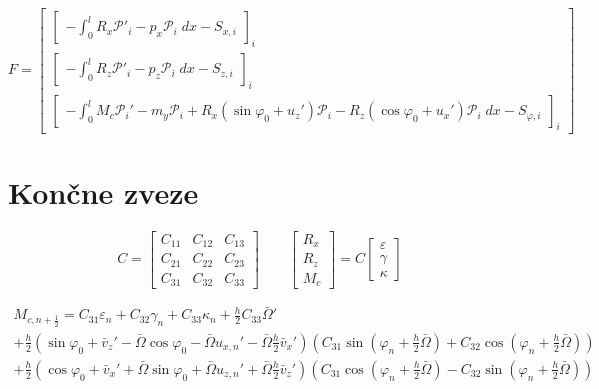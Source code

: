 \documentclass[a4paper,6pt]{article}
\begin{document}
\begin{flushleft}
\begin{equation}
  F=\begin{bmatrix}
      \begin{bmatrix}
        -\int_0^l R_x\mathcal{P}'_i - p_x\mathcal{P}_i\;dx-S_{x,i}
      \end{bmatrix}_i \\
      \begin{bmatrix}
        -\int_0^l R_z\mathcal{P}'_i - p_z\mathcal{P}_i\;dx-S_{z,i}
      \end{bmatrix}_i \\
      \begin{bmatrix}
        -\int_0^l M_c \mathcal{P}_i' -m_y \mathcal{P}_i + R_x(\sin\varphi_0 +u_z')\mathcal{P}_i - R_z(\cos\varphi_0 + u_x') \mathcal{P}_i \;dx-S_{\varphi,i}
      \end{bmatrix}_i
  \end{bmatrix}
\end{equation}


\newpage
\section{Končne zveze}
\begin{equation}
  C=\begin{bmatrix}
    C_{11} & C_{12} & C_{13} \\ C_{21} & C_{22} & C_{23} \\ C_{31} & C _{32} & C_{33}
  \end{bmatrix}
  \qquad 
  \begin{bmatrix}
    R_x \\ R_z \\M_c
  \end{bmatrix} = 
  C \begin{bmatrix}
    \varepsilon \\ \gamma \\ \kappa
   \end{bmatrix}
\end{equation}

\begin{multline}
  M_{c,n+\frac{1}{2}}=C_{31}\varepsilon_n + C_{32}\gamma_n + C_{33}\kappa_n+ \frac{h}{2} C_{33}\bar{\Omega}'\\
    +\frac{h}{2}(\sin\varphi_0 + \bar{v}_z' - \bar{\Omega}\cos\varphi_0 - \bar{\Omega}u_{x,n}' - \bar{\Omega}\frac{h}{2}\bar{v}_x')(C_{31}\sin(\varphi_n+\frac{h}{2}\bar{\Omega})+C_{32}\cos(\varphi_n+\frac{h}{2}\bar{\Omega}))\\
    +\frac{h}{2}(\cos\varphi_0 + \bar{v}_x' + \bar{\Omega}\sin\varphi_0 + \bar{\Omega}u_{z,n}' + \bar{\Omega}\frac{h}{2}\bar{v}_z')(C_{31}\cos(\varphi_n+\frac{h}{2}\bar{\Omega})-C_{32}\sin(\varphi_n+\frac{h}{2}\bar{\Omega}))
\end{multline}


\vspace{1cm}



\end{flushleft}
\end{document}

